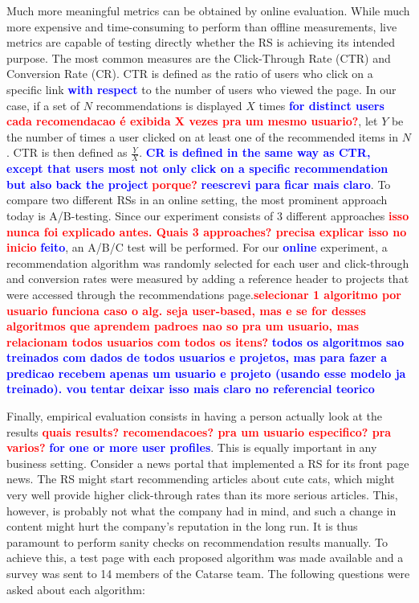 \documentclass[cic,tc,english]{iiufrgs}
\newcommand{\bruno}[1]{\textcolor{red}{\textbf{#1}}}
\newcommand{\adriano}[1]{\textcolor{blue}{\textbf{#1}}}
\begin{document}
Much more meaningful metrics can be obtained by online evaluation. While much more expensive and time-consuming to perform than offline measurements, live metrics are capable of testing directly whether the RS is achieving its intended purpose. The most common measures are the Click-Through Rate (CTR) and Conversion Rate (CR). CTR is defined as the ratio of users who click on a specific link \adriano{with respect} to the number of users who viewed the page. In our case, if a set of $N$ recommendations is displayed $X$ times \adriano{for distinct users} \bruno{cada recomendacao é exibida X vezes pra um mesmo usuario?}, let $Y$ be the number of times a user clicked on at least one of the recommended items in $N$. CTR is then defined as $\frac{Y}{X}$. \adriano{CR is defined in the same way as CTR, except that users most not only click on a specific recommendation but also back the project} \bruno{porque?} \adriano{reescrevi para ficar mais claro}. To compare two different RSs in an online setting, the most prominent approach today is A/B-testing. Since our experiment consists of 3 different approaches \bruno{isso nunca foi explicado antes. Quais 3 approaches? precisa explicar isso no inicio} \adriano{feito}, an A/B/C test will be performed. For our \adriano{online} experiment, a recommendation algorithm was randomly selected for each user and click-through and conversion rates were measured by adding a reference header to projects that were accessed through the recommendations page.\bruno{selecionar 1 algoritmo por usuario funciona caso o alg. seja user-based, mas e se for desses algoritmos que aprendem padroes nao so pra um usuario, mas relacionam todos usuarios com todos os itens?} \adriano{todos os algoritmos sao treinados com dados de todos usuarios e projetos, mas para fazer a predicao recebem apenas um usuario e projeto (usando esse modelo ja treinado). vou tentar deixar isso mais claro no referencial teorico }

Finally, empirical evaluation consists in having a person actually look at the results \bruno{quais results? recomendacoes? pra um usuario especifico? pra varios?} \adriano{for one or more user profiles}. This is equally important in any business setting. Consider a news portal that implemented a RS for its front page news. The RS might start recommending articles about cute cats, which might very well provide higher click-through rates than its more serious articles. This, however, is probably not what the company had in mind, and such a change in content might hurt the company's reputation in the long run. It is thus paramount to perform sanity checks on recommendation results manually. To achieve this, a test page with each proposed algorithm was made available and a survey was sent to 14 members of the Catarse team. The following questions were asked about each algorithm:
\end{document}
